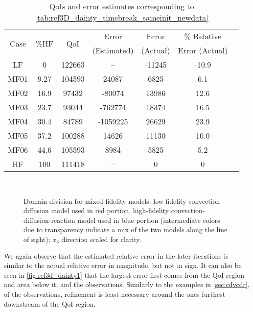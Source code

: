 %
\begin{table}
\caption{QoIs and error estimates corresponding to \cref{tab:ref3D_dainty_timebreak_sameinit_newdata}}
\label{tab:ref3D_dainty_newdata}
\centering
\begin{tabular}{|c|c|c|c|c|c|c|}
\hline
\multirow{2}{*}{Case} & \multirow{2}{*}{$\%$HF} & \multirow{2}{*}{QoI} & Error & Error & $\%$ Relative \\ 
& & & (Estimated) & (Actual) & Error (Actual) \\ \hline
LF   & 0    & 122663 & --       & -11245 & -10.9  \\
MF01 & 9.27 & 104593 & 24087    & 6825   & 6.1  \\
MF02 & 16.9 & 97432  & -80074   & 13986  & 12.6   \\
MF03 & 23.7 & 93044  & -762774  & 18374  & 16.5   \\
MF04 & 30.4 & 84789  & -1059225 & 26629  & 23.9   \\
MF05 & 37.2 & 100288 & 14626    & 11130  & 10.0   \\
MF06 & 44.6 & 105593 & 8984     & 5825   & 5.2   \\ 
HF   & 100  & 111418 & --      & 0       & 0         \\ \hline
\end{tabular}
\end{table}
%
\begin{figure}[htbp]
\centering
{}
 \\
\caption{Domain division for mixed-fidelity models: low-fidelity convection-diffusion model used in red portion, high-fidelity convection-diffusion-reaction model used in blue portion (intermediate colors due to transparency indicate a mix of the two models along the line of sight); $x_3$ direction scaled for clarity.}
\label{fig:divvy3D_dainty}
\end{figure} 
%
We again observe that the estimated relative error in the later iterations is similar to the actual relative error in magnitude, but not in sign. It can also be seen in \cref{fig:ref3d_dainty1} that the largest error first comes from the QoI region and area below it, and the observations. Similarly to the examples in \cref{sec:cdvcdr}, of the observations, refinement is least necessary around the ones furthest downstream of the QoI region.

